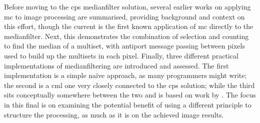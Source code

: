 Before moving to the \gls{cps} \gls{medianfilter} solution, several earlier works on applying \gls{mc} to image processing are summarised, providing background and context on this effort, though the current  is the first known application of \gls{mc} directly to the \gls{medianfilter}.  Next, this  demonstrates the combination of selection and counting to find the median of a multiset, with antiport message passing between pixels used to build up the multisets in each pixel.  Finally, three different practical implementations of \gls{medianfilter}ing are introduced and assessed.  The first implementation is a simple naïve approach, as many programmers might write; the second is a \gls{cml} one very closely connected to the \gls{cps} solution; while the third sits conceptually somewhere between the two and is based on work by \citeauthor{Braunl2001} \cite{Braunl2001}.  The focus in this final  is on examining the potential benefit of using a different principle to structure the processing, as much as it is on the achieved image results.